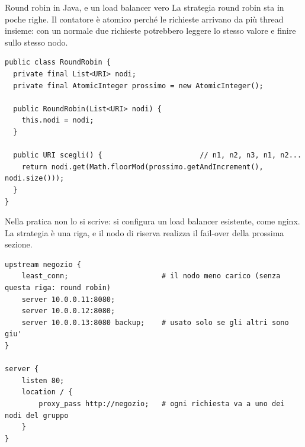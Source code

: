 \noindent\begin{minipage}[c]{0.46\textwidth}
\centering
{}
\end{minipage}\hfill
\begin{minipage}[c]{0.5\textwidth}
\end{minipage}

\begin{esempio}{Round robin in Java, e un load balancer vero}
La strategia round robin sta in poche righe. Il contatore è atomico perché le richieste arrivano da più thread insieme:
con un  normale due richieste potrebbero leggere lo stesso valore e finire sullo stesso nodo.
\begin{lstlisting}[style=java, name=RoundRobin.java]
public class RoundRobin {
  private final List<URI> nodi;
  private final AtomicInteger prossimo = new AtomicInteger();

  public RoundRobin(List<URI> nodi) {
    this.nodi = nodi;
  }

  public URI scegli() {                       // n1, n2, n3, n1, n2...
    return nodi.get(Math.floorMod(prossimo.getAndIncrement(), nodi.size()));
  }
}
\end{lstlisting}
Nella pratica non lo si scrive: si configura un load balancer esistente, come nginx. La strategia è una riga, e il nodo
di riserva realizza il fail-over della prossima sezione.
\begin{lstlisting}[style=conf, name=nginx.conf]
upstream negozio {
    least_conn;                      # il nodo meno carico (senza questa riga: round robin)
    server 10.0.0.11:8080;
    server 10.0.0.12:8080;
    server 10.0.0.13:8080 backup;    # usato solo se gli altri sono giu'
}

server {
    listen 80;
    location / {
        proxy_pass http://negozio;   # ogni richiesta va a uno dei nodi del gruppo
    }
}
\end{lstlisting}
\end{esempio}

